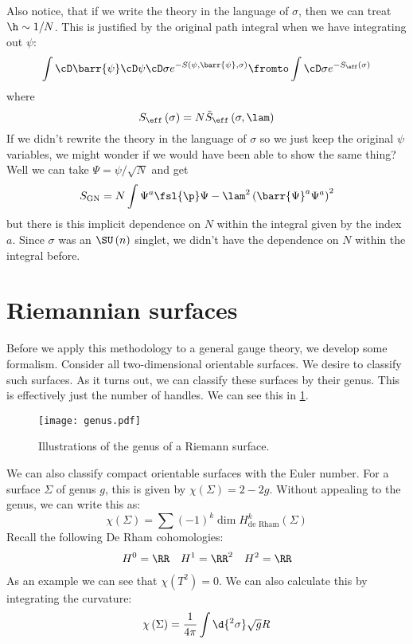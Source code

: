 \documentclass{booc}
\begin{document}
Also notice, that if we write the theory in the language of $\sigma$, 
then we can treat $\h\sim 1/ N$. 
This is justified by the original path integral when we have integrating out $\psi$:
\begin{equation}
\int \cD \barr{\psi}\cD\psi \cD \sigma
e^{-S\left( \psi , \barr{\psi} , \sigma \right)}
\fromto 
\int \cD \sigma e^{-S_{\eff}\left( \sigma \right)}
\end{equation}
where
\begin{equation}
S_\eff\left( \sigma \right) = N\tilde S_\eff\left( \sigma , \lam \right)
\end{equation}
If we didn't rewrite the theory in the language of $\sigma$ so we just keep
the original $\psi$ variables, we might wonder if we would have been able to show the same thing?
Well we can take $\Psi = \psi / \sqrt{N}$ and get
\begin{equation}
S_{\text{GN}} = N\int \Psi^a \fsl{\p} \Psi - \lam^2\left( \barr{\Psi}^a \Psi^a \right)^2
\end{equation}
but there is this implicit dependence on $N$ within the integral given by the index $a$.
Since $\sigma$ was an $\SU\left( n \right)$ singlet, 
we didn't have the dependence on $N$ within the integral before.


\section{Riemannian surfaces}

Before we apply this methodology to a general gauge theory, we develop some formalism. 
Consider all two-dimensional orientable surfaces. 
We desire to classify such surfaces. 
As it turns out, we can classify these surfaces by their genus. This is effectively just
the number of handles. We can see this in \cref{fig:genus}.
\begin{figure}
\texttt{[image: genus.pdf]}
\caption{Illustrations of the genus of a Riemann surface.}
\label{fig:genus}
\end{figure}

We can also classify compact orientable surfaces with the Euler number.
For a surface $\Sigma$ of genus $g$, this is given by 
$\chi\left( \Sigma \right) = 2 - 2g$. Without appealing to the genus, we can write this as:
\begin{equation}
\chi\left( \Sigma \right) = \sum \left( -1 \right)^k \dim
H^k_{\text{de Rham} }\left( \Sigma \right)
\end{equation}
Recall the following De Rham cohomologies:
\begin{align}
H^0 = \RR
&&
H^1 = \RR^2 
&&
H^2 = \RR
\end{align}
As an example we can see that $\chi\left( T^2 \right) = 0$.
We can also calculate this by integrating the curvature:
\begin{equation}
\chi\left( \Sigma \right) = \frac{1}{4\pi} \int \d{^2 \sigma} \sqrt{g} R
\end{equation}
\end{document}
